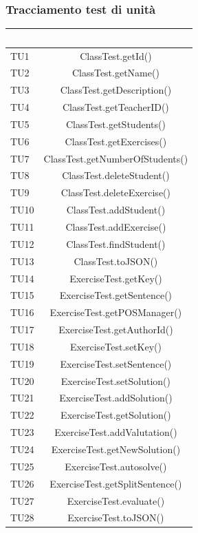 \subsubsection{Tracciamento test di unità}
\begin{longtable}{|>{\centering\arraybackslash}m{1.6cm}|c|}		
 	\rowcolor{LightBlue}
		\textbf{\textcolor{white}{Test}}
		& \textbf{\textcolor{white}{Metodo}}\\		\hline
		TU1 & ClassTest.getId()\\ \hline
		TU2 & ClassTest.getName()\\ \hline
		TU3 & ClassTest.getDescription()\\ \hline
		TU4 & ClassTest.getTeacherID()\\ \hline
		TU5 & ClassTest.getStudents()\\ \hline
		TU6 & ClassTest.getExercises()\\ \hline
		TU7 & ClassTest.getNumberOfStudents()\\ \hline
		TU8 & ClassTest.deleteStudent()\\ \hline
		TU9 & ClassTest.deleteExercise()\\ \hline
		TU10 & ClassTest.addStudent()\\ \hline
		TU11 & ClassTest.addExercise()\\ \hline
		TU12 & ClassTest.findStudent()\\ \hline
		TU13 & ClassTest.toJSON()\\ \hline
		
		TU14 & ExerciseTest.getKey()\\ \hline
		TU15 & ExerciseTest.getSentence()\\ \hline
		TU16 & ExerciseTest.getPOSManager()\\ \hline
		TU17 & ExerciseTest.getAuthorId()\\ \hline
		TU18 & ExerciseTest.setKey()\\ \hline
		TU19 & ExerciseTest.setSentence()\\ \hline
		TU20 & ExerciseTest.setSolution()\\ \hline
		TU21 & ExerciseTest.addSolution()\\ \hline
		TU22 & ExerciseTest.getSolution()\\ \hline
		TU23 & ExerciseTest.addValutation()\\ \hline
		TU24 & ExerciseTest.getNewSolution()\\ \hline
		TU25 & ExerciseTest.autosolve()\\ \hline
		TU26 & ExerciseTest.getSplitSentence()\\ \hline
		TU27 & ExerciseTest.evaluate()\\ \hline
		TU28 & ExerciseTest.toJSON()\\ \hline
		

\end{longtable}
